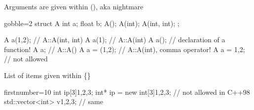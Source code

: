 \begin{frame}[fragile]
  \begin{block}{Arguments are given within (), aka  nightmare}
    \begin{cppcode*}{gobble=2}
      struct A {
        int a;
        float b;
        A();
        A(int);
        A(int, int);
      };

      A a(1,2);    // A::A(int, int)
      A a(1);      // A::A(int)
      A a();       // declaration of a function!
      A a;         // A::A()
      A a = (1,2); // A::A(int), comma operator!
      A a = {1,2}; // not allowed
    \end{cppcode*}
  \end{block}
\end{frame}

\begin{frame}[fragile]
  \begin{exampleblock}{List of items given within \{\}}
    \begin{cppcode*}{firstnumber=10}
     int ip[3]{1,2,3};
     int* ip = new int[3]{1,2,3}; // not allowed in C++98
     std::vector<int> v{1,2,3};   // same
    \end{cppcode*}
  \end{exampleblock}
\end{frame}
